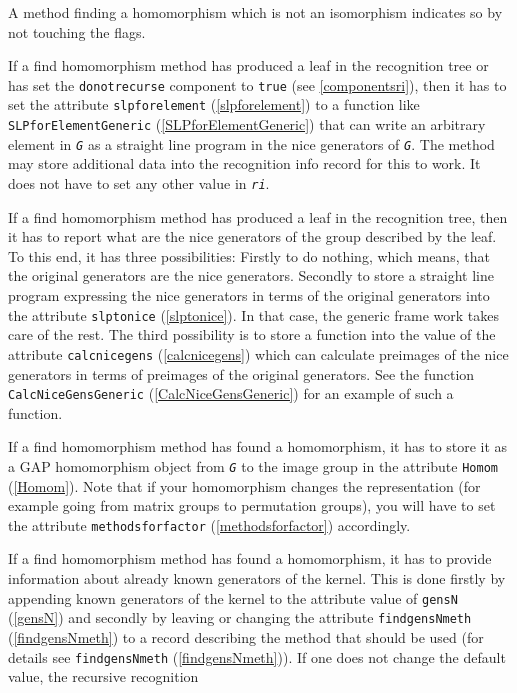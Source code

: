 \documentclass[a4paper,11pt]{report}
\begin{document}
{{\begin{description}
 A method finding a homomorphism which is not an isomorphism indicates so by
not touching the flags. 
\item[{for leaves: \texttt{SLPforElement} (\ref{SLPforElement}) function}]  If a find homomorphism method has produced a leaf in the recognition tree or
has set the \texttt{donotrecurse} component to \texttt{true} (see \ref{componentsri}), then it has to set the attribute \texttt{slpforelement} (\ref{slpforelement}) to a function like \texttt{SLPforElementGeneric} (\ref{SLPforElementGeneric}) that can write an arbitrary element in \mbox{\texttt{\mdseries\slshape G}} as a straight line program in the nice generators of \mbox{\texttt{\mdseries\slshape G}}. The method may store additional data into the recognition info record for
this to work. It does not have to set any other value in \mbox{\texttt{\mdseries\slshape ri}}. 
\item[{for leaves: information about nice generators}]  If a find homomorphism method has produced a leaf in the recognition tree,
then it has to report what are the nice generators of the group described by
the leaf. To this end, it has three possibilities: Firstly to do nothing,
which means, that the original generators are the nice generators. Secondly to
store a straight line program expressing the nice generators in terms of the
original generators into the attribute \texttt{slptonice} (\ref{slptonice}). In that case, the generic frame work takes care of the rest. The third
possibility is to store a function into the value of the attribute \texttt{calcnicegens} (\ref{calcnicegens}) which can calculate preimages of the nice generators in terms of preimages of
the original generators. See the function \texttt{CalcNiceGensGeneric} (\ref{CalcNiceGensGeneric}) for an example of such a function. 
\item[{for non-leaves: the homomorphism itself}]  If a find homomorphism method has found a homomorphism, it has to store it as
a \textsf{GAP} homomorphism object from \mbox{\texttt{\mdseries\slshape G}} to the image group in the attribute \texttt{Homom} (\ref{Homom}). Note that if your homomorphism changes the representation (for example going
from matrix groups to permutation groups), you will have to set the attribute \texttt{methodsforfactor} (\ref{methodsforfactor}) accordingly. 
\item[{for non-leaves: kernel generators}]  If a find homomorphism method has found a homomorphism, it has to provide
information about already known generators of the kernel. This is done firstly
by appending known generators of the kernel to the attribute value of \texttt{gensN} (\ref{gensN}) and secondly by leaving or changing the attribute \texttt{findgensNmeth} (\ref{findgensNmeth}) to a record describing the method that should be used (for details see \texttt{findgensNmeth} (\ref{findgensNmeth})). If one does not change the default value, the recursive recognition

\end{description}}}
\end{document}
